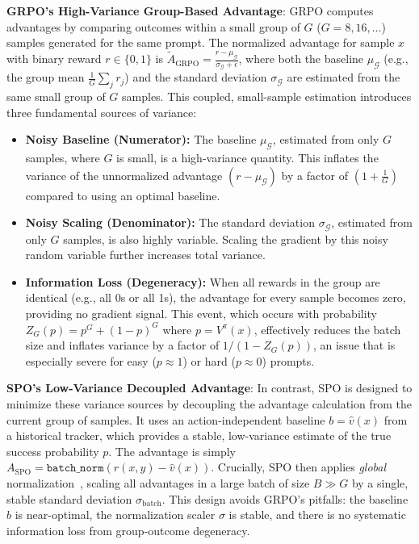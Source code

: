 \textbf{GRPO's High-Variance Group-Based Advantage}: 
GRPO computes advantages by comparing outcomes within a small group of $G$ ($G = 8, 16, ...$) samples generated for the same prompt. The normalized advantage for sample $x$ with binary reward $r \in \{0,1\}$ is
$    \tilde{A}_{\text{GRPO}} = \frac{r - \mu_\mathcal{G}}{\sigma_{\mathcal{G}} + \epsilon}$,
where both the baseline $\mu_\mathcal{G}$ (e.g., the group mean $\frac{1}{G}\sum_{j} r_j$) and the standard deviation $\sigma_{\mathcal{G}}$ are estimated from the same small group of $G$ samples. This coupled, small-sample estimation introduces three fundamental sources of variance:
\begin{itemize}
    \item \textbf{Noisy Baseline (Numerator):} The baseline $\mu_\mathcal{G}$, estimated from only $G$ samples, where $G$ is small, is a high-variance quantity. This inflates the variance of the unnormalized advantage $(r - \mu_\mathcal{G})$ by a factor of $(1 + \frac{1}{G})$ compared to using an optimal baseline.
    \item \textbf{Noisy Scaling (Denominator):} The standard deviation $\sigma_{\mathcal{G}}$, estimated from only $G$ samples, is also highly variable. Scaling the gradient by this noisy random variable further increases total variance.
    \item \textbf{Information Loss (Degeneracy):} When all rewards in the group are identical (e.g., all 0s or all 1s), the advantage for every sample becomes zero, providing no gradient signal. This event, which occurs with probability $Z_G(p) = p^G + (1-p)^G$ where $p=V^\pi(x)$, effectively reduces the batch size and inflates variance by a factor of $1/(1-Z_G(p))$, an issue that is especially severe for easy ($p \approx 1$) or hard ($p \approx 0$) prompts.
\end{itemize}

\textbf{SPO's Low-Variance Decoupled Advantage}:
In contrast, SPO is designed to minimize these variance sources by decoupling the advantage calculation from the current group of samples. It uses an action-independent baseline $b = \hat{v}(x)$ from a historical tracker, which provides a stable, low-variance estimate of the true success probability $p$. The advantage is simply $A_{\text{SPO}} = \texttt{batch\_norm}(r(x, y) - \hat{v}(x))$. Crucially, SPO then applies \emph{global} normalization~\cite{PPO,andrychowicz2020matters,liu2025part}, scaling all advantages in a large batch of size $B \gg G$ by a single, stable standard deviation $\sigma_{\text{batch}}$. This design avoids GRPO's pitfalls: the baseline $b$ is near-optimal, the normalization scaler $\sigma$ is stable, and there is no systematic information loss from group-outcome degeneracy.



